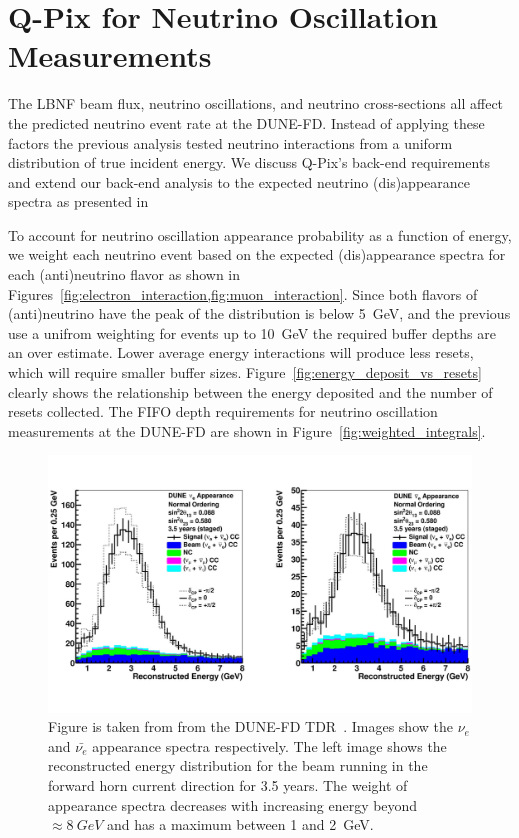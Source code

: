 \section{Q-Pix for Neutrino Oscillation Measurements}

The LBNF beam flux, neutrino oscillations, and neutrino cross-sections all affect the predicted neutrino event rate at the DUNE-FD.
Instead of applying these factors the previous analysis tested neutrino interactions from a uniform distribution of true incident energy.
We discuss Q-Pix's back-end requirements and extend our back-end analysis to the expected neutrino (dis)appearance spectra as presented in~\citep{DUNE_FD_TDRv2_2020}

To account for neutrino oscillation appearance probability as a function of energy, we weight each neutrino event based on the expected (dis)appearance spectra for each (anti)neutrino flavor as shown in Figures~\cref{fig:electron_interaction,fig:muon_interaction}.
Since both flavors of (anti)neutrino have the peak of the distribution is below 5~\unit{GeV}, and the previous use a unifrom weighting for events up to 10~\unit{GeV} the required buffer depths are an over estimate.
Lower average energy interactions will produce less resets, which will require smaller buffer sizes.
Figure~\ref{fig:energy_deposit_vs_resets} clearly shows the relationship between the energy deposited and the number of resets collected.
The FIFO depth requirements for neutrino oscillation measurements at the DUNE-FD are shown in Figure~\ref{fig:weighted_integrals}.

\begin{figure}[]
\centering
\includegraphics[width=\textwidth]{images/tdr_electron_reconstruction_tdrv2.pdf}
\caption{Figure is taken from from the DUNE-FD TDR~\citep{DUNE_FD_TDRv2_2020}.
Images show the $\nu_{e}$ and $\bar{\nu_{e}}$ appearance spectra respectively.
The left image shows the reconstructed energy distribution for the beam running in the forward horn current direction for 3.5 years.
The weight of appearance spectra decreases with increasing energy beyond $\approx 8~\unit{GeV}$ and has a maximum between 1 and 2~\unit{GeV}.
}
\end{figure}~\label{fig:electron_interaction}


